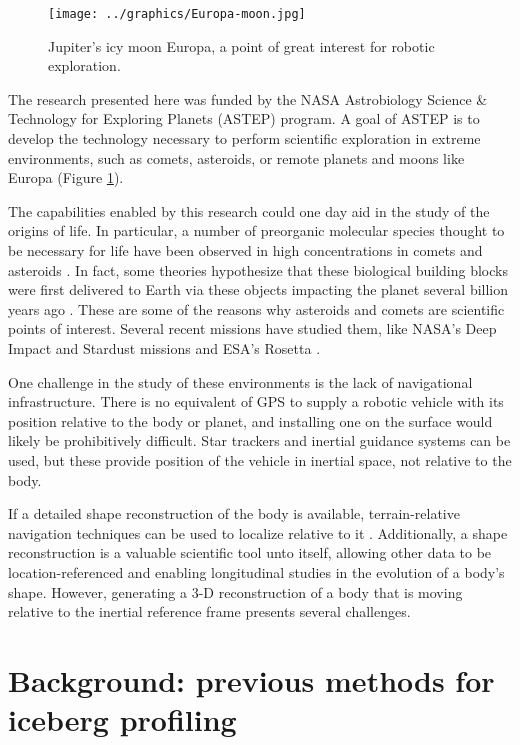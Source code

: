 \begin{figure}[htb]
   \centering
   \texttt{[image: ../graphics/Europa-moon.jpg]} %
   \caption{Jupiter's icy moon Europa, a point of great interest for robotic exploration.}
   \label{fig:Europa}
\end{figure}

The research presented here was funded by the NASA Astrobiology Science \& Technology for Exploring Planets (ASTEP) program. A goal of ASTEP is to develop the technology necessary to perform scientific  exploration in extreme environments, such as comets, asteroids, or remote planets and moons like Europa (Figure \ref{fig:Europa}).

The capabilities enabled by this research could one day aid in the study of the origins of life. In particular, a number of preorganic molecular species thought to be necessary for life have been observed in high concentrations in comets and asteroids \cite{Fomenkova1999}. In fact, some theories hypothesize that these biological building blocks were first delivered to Earth via these objects impacting the planet several billion years ago \cite{Chyba1992}. These are some of the reasons why asteroids and comets are scientific points of interest. Several recent missions have studied them, like NASA's Deep Impact and Stardust missions\cite{Ahearn2005,Willcockson1999} and ESA's Rosetta \cite{Bibring2007}.

One challenge in the study of these environments is the lack of navigational infrastructure. There is no equivalent of GPS to supply a robotic vehicle with its position relative to the body or planet, and installing one on the surface would likely be prohibitively difficult. Star trackers and inertial guidance systems can be used, but these provide position of the vehicle in inertial space, not relative to the body.

If a detailed shape reconstruction of the body is available, terrain-relative navigation techniques can be used to localize relative to it \cite{Anonsen2006,Anonsen2007}. Additionally, a shape reconstruction is a valuable scientific tool unto itself, allowing other data to be location-referenced and enabling longitudinal studies in the evolution of a body's shape. However, generating a 3-D reconstruction of a body that is moving relative to the inertial reference frame presents several challenges.

\section{Background: previous methods for iceberg profiling}

